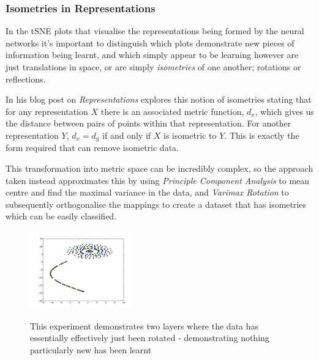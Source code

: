 \documentclass[a4paper,11pt,titlepage]{article}
\begin{document}
	\subsubsection{Isometries in Representations}
	In the tSNE plots that visualise the representations being formed by the neural networks it's important to distinguish which plots demonstrate new pieces of information being learnt, and which simply appear to be learning however are just translations in space, or are simply \textit{isometries} of one another; rotations or reflections.
	\par 
	In his blog post on \textit{Representations} \cite{Olah2014} explores this notion of isometries stating that for any representation $ X $ there is an associated metric function, $ d_{x} $, which gives us the distance between pairs of points within that representation. For another representation $ Y $, $ d_{x} = d_{y} $ if and only if $ X $ is isometric to $ Y $. This is exactly the form required that can remove isometric data.
		\par 
		This transformation into metric space can be incredibly complex, so the approach taken instead approximates this by using \textit{Principle Component Analysis} to mean centre and find the maximal variance in the data, and \textit{Varimax Rotation} to subsequently orthogonalise the mappings to create a dataset that has isometries which can be easily classified.
		
		\begin{figure}[H]
    			\qquad
    			{{\includegraphics[width=0.4\textwidth]
    				{img/sne_plot_E2_L3_rotation.png} 
    			}}%
    			\caption{This experiment demonstrates two layers where the data has essentially effectively just been rotated - demonstrating nothing particularly new has been learnt}%
		\end{figure}
\end{document}
